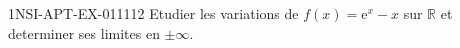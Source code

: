 \begin{exercice}{1NSI-APT-EX-011}{1}{12}
Etudier les variations de $f(x) = \mathrm{e}^x - x$ sur $\mathbb{R}$ et determiner ses limites en $\pm\infty$.

\end{exercice}
